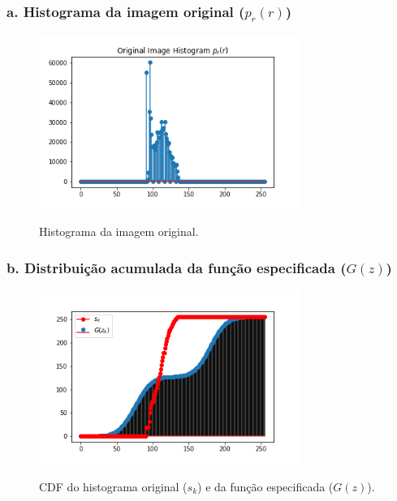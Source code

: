 \documentclass{article}
\begin{document}
\subsubsection*{a. Histograma da imagem original ($p_r(r)$)}

\label{sec:format}
\begin{figure}[H]
	\label{original_hist}
	\begin{minipage}[b]{1.0\linewidth}
		\centering
		\centerline{\includegraphics[width=8.5cm]{Figures/hist_original_fig}}
		\centerline{Histograma da imagem original.}\medskip
	\end{minipage}
\end{figure}

\subsubsection*{b. Distribuição acumulada da função especificada ($G(z)$)}

\begin{figure}[H]
	\begin{minipage}[b]{1.0\linewidth}
		\label{fig:original_cdf}
		\centering
		\centerline{\includegraphics[width=8.5cm]{Figures/cdf_images}}
		\centerline{CDF do histograma original ($s_k$) e da função especificada ($G(z)$).}\medskip
	\end{minipage}
\end{figure}
\end{document}
